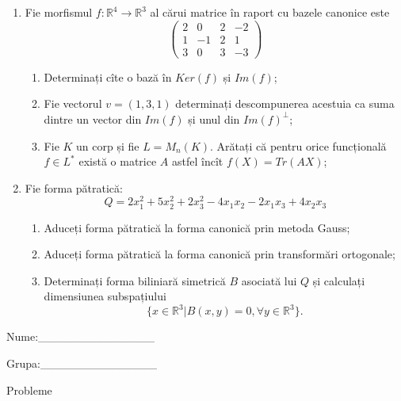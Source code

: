 \documentclass{article}
\begin{document}
\begin{enumerate}
 \item Fie morfismul $f:\mathbb{R}^4 \to \mathbb{R}^3$ al cărui matrice în raport cu bazele canonice este
$$\begin{pmatrix}
2&0&2&-2\\
1&-1&2&1\\
3&0&3&-3
\end{pmatrix}$$

\begin{enumerate}
\item Determinați cîte o bază în $Ker(f)$ și $Im(f)$;
\item Fie vectorul $v=(1,3,1)$ determinați descompunerea acestuia ca suma dintre un vector din $Im(f)$ și unul din $Im(f)^\perp$;
\item Fie $K$ un corp și fie $L=M_n(K)$. Arătați că pentru orice funcțională $f \in L^*$ există o matrice $A$ astfel încît $f(X)=Tr(AX)$;
\end{enumerate}
\item Fie forma pătratică:
$$Q= 2x_1^2+5x_2^2+2x_3^2-4x_1x_2-2x_1x_3+4x_2x_3$$

\begin{enumerate}
\item Aduceți forma pătratică la forma canonică prin metoda Gauss;
\item Aduceți forma pătratică la forma canonică prin transformări ortogonale;
\item Determinați forma biliniară simetrică $B$ asociată lui $Q$ și calculați dimensiunea subspațiului
$$\{x \in \mathbb{R}^3 | B(x,y)=0,\forall y \in \mathbb{R}^3\}.$$

\end{enumerate}
\end{enumerate}
\newpage
\begin{flushright}
Nume:\_\_\_\_\_\_\_\_\_\_\_\_\_\_
 
 
Grupa:\_\_\_\_\_\_\_\_\_\_\_\_\_\_
\end{flushright}
\begin{center}
\vspace{2cm}
{\Large Probleme}
\vspace{2cm}
\end{center}
\end{document}
